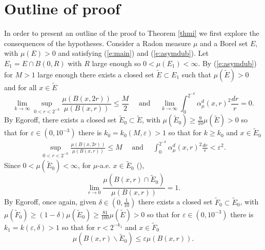 \documentclass[11pt]{amsart}
\newcommand{\rf}[1]{{(\ref{#1})}}
\newcommand{\ve}{{\varepsilon}}
\newcommand{\vv}{{\vspace{2mm}}}
\newcommand{\wt}[1]{{\widetilde{#1}}}
\newcommand{\Bl}{\color{blue}}
\theoremstyle{definition}
\theoremstyle{remark}
\numberwithin{equation}{section}
\newcommand{\xavi}[1]{}%
\begin{document}
\vv

\section{Outline of proof}


\xavi{In this section I made some cosmetic changes: added commas, separated or joining equations, corrected a typo...}
In order to present an outline of the proof to Theorem \ref{thmi} we first explore the consequences of the hypotheses. Consider a Radon measure $\mu$ and a Borel set $E$, with $\mu(E)>0$ and satisfying 
\rf{e:main} and \rf{e:asymdub}. Let $E_1=E\cap B(0,R)$ with $R$ large enough so $0<\mu(E_1)<\infty$. By  \rf{e:asymdub} for $M>1$ large enough there exists a closed set $\wt E\subset E_1$ such that $\mu(\wt E)>0$ and for all
$x\in \wt E$
$$	\lim_{k\to\infty}\sup_{0<r<2^{-k}}\frac{\mu(B(x,2r))}{\mu(B(x,r))} \le \frac{M}{2}\quad \text{ and }\quad
\lim_{k\to\infty}\int_{0}^{2^{-k}} \alpha_{\mu}^{d}(x,r)^{2}\frac{dr}{r}=0.$$
By Egoroff, there exists a closed set $\wt E_0\subset \wt E$, with $\mu(\wt E_0)\ge \frac{9}{10}\mu(\wt E)>0$ so that for $\ve\in (0,10^{-3})$ there is $k_0=k_0(M,\ve)>1$ so that for $k\ge k_0$ and $x\in \wt E_0$
\begin{align}\label{quantified-hyp}
	\sup_{0<r<2^{-k}}\frac{\mu(B(x,2r))}{\mu(B(x,r))} \le M\quad \text{ and }\quad
\int_{0}^{2^{-k}} \alpha_{\mu}^{d}(x,r)^{2}\frac{dr}{r}<\ve^2.
	\end{align}
Since $0<\mu(\wt E_0)<\infty$, for $\mu$-a.e. $x\in \wt E_0$ (\cite[Corollary 2.14]{Mattila}),
\begin{equation}\label{rel-density}
\lim_{r\to 0}\frac{\mu(B(x,r)\cap \wt E_0)}{\mu(B(x,r))}=1.
\end{equation}	
By Egoroff, once again, given $\delta\in (0,\frac{1}{10})$ there exists a closed set $\wt F_0\subset \wt E_0$, with $\mu(\wt F_0)\ge (1-\delta)\mu(\wt E_0)\ge\frac{81}{100}\mu(\wt E)>0$ so that for $\ve\in (0,10^{-3})$ there is $k_1=k(\ve,\delta)>1$ so that 
for $r<2^{-k_1}$ and $x\in \wt F_0$
\begin{equation}\label{quant-rel-den}
\mu(B(x,r)\backslash \wt E_0)\le \ve\mu(B(x,r)).
\end{equation}
\end{document}
